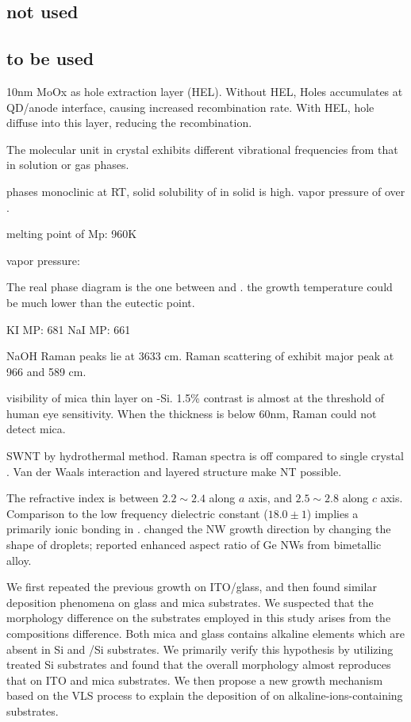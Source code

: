 \subsection{not used}

\subsection{to be used}


10nm MoOx as hole extraction layer (HEL). Without HEL, Holes accumulates at QD/anode interface, causing increased recombination rate. With HEL, hole diffuse into this layer, reducing the recombination. 

The molecular unit in crystal exhibits different vibrational frequencies from that in solution or gas phases.

 phases monoclinic at RT, solid solubility of  in solid  is high. vapor pressure of  over .

melting point of 
Mp:  960K

 vapor pressure:

The real phase diagram is the one between  and .
the growth temperature could be much lower than the eutectic point.

KI MP:  681
NaI MP: 661

NaOH Raman peaks lie at 3633 cm. \cite{walrafen2006} Raman scattering of  exhibit major peak at 966 and 589 cm.\cite{Richet1996}

visibility of mica thin layer on -Si. \cite{Castellanos-gomez2011} 1.5\% contrast is almost at the threshold of human eye sensitivity.  When the thickness is below 60nm, Raman could not detect mica.

 SWNT by hydrothermal method.\cite{Hu2008a} Raman spectra is off compared to single crystal .  Van der Waals interaction and layered structure make NT possible.


The refractive index is between $ 2.2\sim 2.4$ along $a$ axis, and $ 2.5\sim 2.8$ along $c$ axis. Comparison to the low frequency dielectric constant ($18.0\pm1$) implies a primarily ionic bonding in .\cite{He2003}
\citeauthor{Wang2013c} changed the NW growth direction by changing the shape of droplets; \citeauthor{Biswas2013} reported enhanced aspect ratio of Ge NWs from bimetallic alloy.

We first repeated the previous growth on ITO/glass, and then found similar deposition phenomena on glass and mica substrates. We suspected that the morphology difference on the substrates employed in this study arises from the compositions difference. Both mica and glass contains alkaline elements which are absent in Si and /Si substrates. We primarily verify this hypothesis by utilizing  treated Si substrates and found that the overall morphology almost reproduces that on ITO and mica substrates. We then propose a new growth mechanism based on the VLS process to explain the deposition of  on alkaline-ions-containing substrates.

